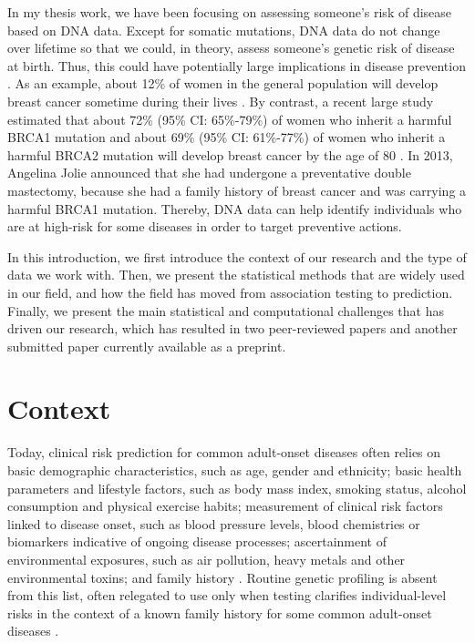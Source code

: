 In my thesis work, we have been focusing on assessing someone's risk of disease based on DNA data. Except for somatic mutations, DNA data do not change over lifetime so that we could, in theory, assess someone's genetic risk of disease at birth. Thus, this could have potentially large implications in disease prevention \cite[]{mavaddat2015prediction,pashayan2015implications}.
As an example, about 12\% of women in the general population will develop breast cancer sometime during their lives \cite[]{desantis2016breast}. By contrast, a recent large study estimated that about 72\% (95\% CI: 65\%-79\%) of women who inherit a harmful BRCA1 mutation and about 69\% (95\% CI: 61\%-77\%) of women who inherit a harmful BRCA2 mutation will develop breast cancer by the age of 80 \cite[]{kuchenbaecker2017risks}. 
In 2013, Angelina Jolie announced that she had undergone a preventative double mastectomy, because she had a family history of breast cancer and was carrying a harmful BRCA1 mutation.
Thereby, DNA data can help identify individuals who are at high-risk for some diseases in order to target preventive actions.

In this introduction, we first introduce the context of our research and the type of data we work with. Then, we present the statistical methods that are widely used in our field, and how the field has moved from association testing to prediction. Finally, we present the main statistical and computational challenges that has driven our research, which has resulted in two peer-reviewed papers and another submitted paper currently available as a preprint.

\section{Context}

Today, clinical risk prediction for common adult-onset diseases often relies on basic demographic characteristics, such as age, gender and ethnicity; basic health parameters and lifestyle factors, such as body mass index, smoking status, alcohol consumption and physical exercise habits; measurement of clinical risk factors linked to disease onset, such as blood pressure levels, blood chemistries or biomarkers indicative of ongoing disease processes; ascertainment of environmental exposures, such as air pollution, heavy metals and other environmental toxins; and family history \cite[]{torkamani2018personal}.
Routine genetic profiling is absent from this list, often relegated to use only when testing clarifies individual-level risks in the context of a known family history for some common adult-onset
diseases \cite[]{torkamani2018personal}.

